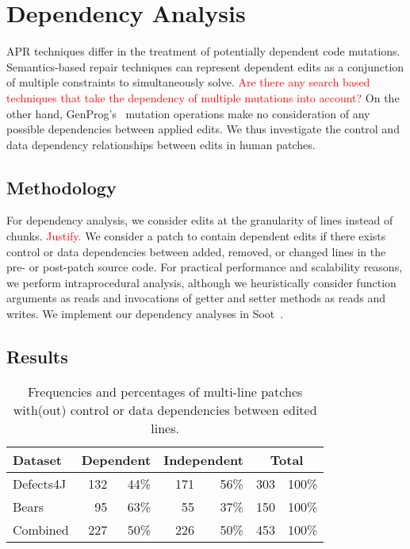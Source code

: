 \documentclass[sigconf, timestamp-false, anonymous=true]{acmart}
\newcommand\todo[1]{\textcolor{red}{#1}}
\begin{document}




\section{Dependency Analysis}


APR techniques differ in the treatment of potentially dependent code mutations.
Semantics-based repair techniques can represent dependent edits as a 
conjunction of multiple constraints to simultaneously solve.
\todo{Are there any search based techniques that take the dependency of 
multiple mutations into account?}
On the other hand, GenProg's~\cite{genprog}
mutation operations make no consideration of 
any possible dependencies between applied edits.
We thus investigate the control and data dependency relationships between 
edits in human patches.

\subsection{Methodology}

For dependency analysis, we consider edits at the granularity of lines instead 
of chunks. \todo{Justify.} We consider a patch to contain
dependent edits if there exists control or data dependencies 
between added, removed, or changed lines in the pre- or post-patch
source code. For practical performance and scalability
reasons, we perform intraprocedural analysis, 
although we heuristically consider function arguments as reads 
and invocations of getter and setter methods as reads and writes.
We implement our dependency analyses in Soot~\cite{soot}.

\subsection{Results}

\begin{table}
{\begin{center}
	\begin{tabular}{l | rr | rr | rr}
		\toprule
		Dataset & \multicolumn{2}{c}{Dependent} & \multicolumn{2}{c}{Independent} & \multicolumn{2}{c}{Total}  \\
		\midrule
		Defects4J & 132  & 44\% & 171 & 56\% & 303 & 100\% \\
		Bears & 95 & 63\% & 55 & 37\% & 150 & 100\% \\
		Combined & 227 & 50\% & 226 & 50\% & 453 & 100\% \\
		\bottomrule
	\end{tabular}
 \end{center}
}
	\caption{Frequencies and percentages of multi-line patches with(out) control or data 
	dependencies between edited lines.}
	\label{tab:dependency}
\end{table}
\end{document}
